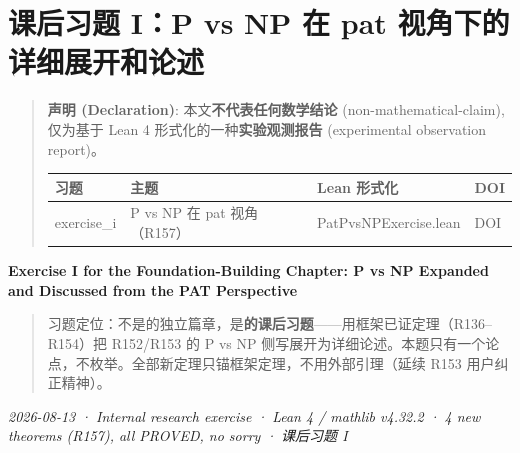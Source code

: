 \documentclass[
]{article}
\author{}
\date{}
\newcounter{none} %
\begin{document}
\section{课后习题 I：P vs NP 在 pat
视角下的详细展开和论述}\label{ux7b51ux57faux7bc7ux8bfeux540eux4e60ux9898-ip-vs-np-ux5728-pat-ux89c6ux89d2ux4e0bux7684ux8be6ux7ec6ux5c55ux5f00ux548cux8bbaux8ff0}

\begin{quote}
\textbf{声明 (Declaration)}: 本文\textbf{不代表任何数学结论}
(non-mathematical-claim), 仅为基于 Lean 4
形式化的一种\textbf{实验观测报告} (experimental observation report)。

{\def\LTcaptype{none} %
\begin{longtable}[]{@{}
 >{\raggedright\arraybackslash}p{}
 >{\raggedright\arraybackslash}p{}
 >{\raggedright\arraybackslash}p{}
 >{\raggedright\arraybackslash}p{}@{}}
\toprule\noalign{}
\begin{minipage}[b]{\linewidth}\raggedright
习题
\end{minipage} & \begin{minipage}[b]{\linewidth}\raggedright
主题
\end{minipage} & \begin{minipage}[b]{\linewidth}\raggedright
Lean 形式化
\end{minipage} & \begin{minipage}[b]{\linewidth}\raggedright
DOI
\end{minipage} \\
\midrule\noalign{}
\endhead
\bottomrule\noalign{}
\endlastfoot
exercise\_i & P vs NP 在 pat 视角（R157） & PatPvsNPExercise.lean &
DOI \\
\end{longtable}
}
\end{quote}

\textbf{Exercise I for the Foundation-Building Chapter: P vs NP Expanded
and Discussed from the PAT Perspective}

\begin{quote}
习题定位：不是的独立篇章，是\textbf{的课后习题}------用框架已证定理（R136--R154）把
R152/R153 的 P vs NP
侧写展开为详细论述。本题只有一个论点，不枚举。全部新定理只锚框架定理，不用外部引理（延续
R153 用户纠正精神）。
\end{quote}

\emph{2026-08-13 · Internal research exercise · Lean 4 / mathlib v4.32.2
· 4 new theorems (R157), all PROVED, no sorry · 课后习题
I }
\end{document}
